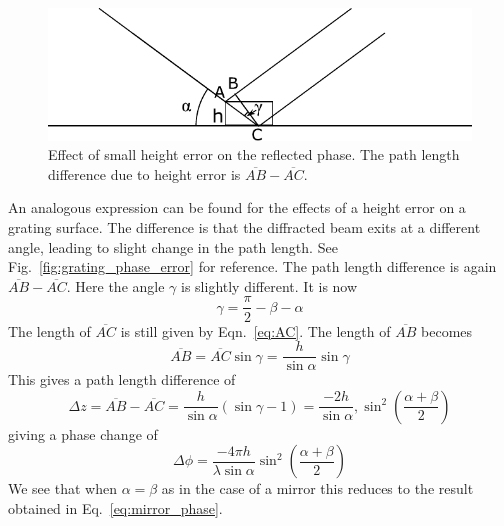 \documentclass[11pt,fleqn]{article} %
\begin{document}
\begin{figure}[htb]
\begin{center}
\includegraphics[width=1.0\textwidth]{Figures/phase_error.pdf}
\caption{Effect of small height error on the reflected phase. The path length difference due to height error is $\overline{AB} - \overline{AC}$.}
\label{fig:phase_error}
\end{center}
\end{figure}

An analogous expression can be found for the effects of a height error on a grating surface. The difference is that the diffracted beam exits at a different angle, leading to slight change in the path length. See Fig.~\ref{fig:grating_phase_error} for reference. The path length difference is again $\overline{AB} - \overline{AC}$. Here the angle $\gamma$ is slightly different. It is now
\begin{equation}
\gamma = \frac{\pi}{2} - \beta - \alpha
\end{equation}
The length of $\overline{AC}$ is still given by Eqn.~\ref{eq:AC}. The length of $\overline{AB}$ becomes
\begin{equation}
\overline{AB} = \overline{AC} \sin\gamma = \frac{h}{\sin\alpha} \sin\gamma
\end{equation}
This gives a path length difference of
\begin{equation}
\Delta z = \overline{AB} - \overline{AC} = \frac{h}{\sin\alpha} \left(\sin\gamma - 1 \right) = \frac{-2 h}{\sin\alpha},\sin^2\left(\frac{\alpha+\beta}{2}\right)
\end{equation}
giving a phase change of
\begin{equation}
\Delta \phi = \frac{-4 \pi h}{\lambda \sin\alpha} \sin^2\left(\frac{\alpha+\beta}{2}\right)
\end{equation}
We see that when $\alpha=\beta$ as in the case of a mirror this reduces to the result obtained in Eq.~\ref{eq:mirror_phase}.
\end{document}
